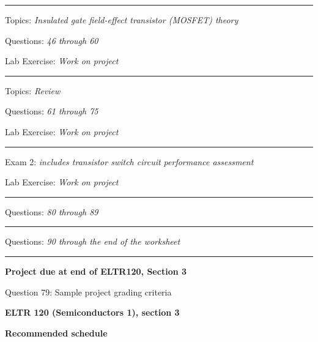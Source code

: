 \vskip 10pt
\hrule \vskip 5pt
\noindent
{}

\hskip 10pt Topics: {\it Insulated gate field-effect transistor (MOSFET) theory}
 
\hskip 10pt Questions: {\it 46 through 60}
 
\hskip 10pt Lab Exercise: {\it Work on project}
 

\vskip 10pt
\hrule \vskip 5pt
\noindent
{}

\hskip 10pt Topics: {\it Review}
 
\hskip 10pt Questions: {\it 61 through 75}
 
\hskip 10pt Lab Exercise: {\it Work on project}
 
\vskip 10pt
\hrule \vskip 5pt
\noindent
{}

\hskip 10pt Exam 2: {\it includes transistor switch circuit performance assessment}
 
\hskip 10pt Lab Exercise: {\it Work on project}

\vskip 10pt
\hrule \vskip 5pt
\noindent
{}

\hskip 10pt Questions: {\it 80 through 89}
 
\vskip 10pt
\hrule \vskip 5pt
\noindent
{}

\hskip 10pt Questions: {\it 90 through the end of the worksheet}
 
\vskip 10pt
\hrule \vskip 5pt
\noindent
{}

\hskip 10pt {\bf Project due at end of ELTR120, Section 3}
 
\hskip 10pt Question 79: Sample project grading criteria
 
\vskip 10pt












\vfil \eject

\centerline{\bf ELTR 120 (Semiconductors 1), section 3} \bigskip 
 
\vskip 10pt

\noindent
{\bf Recommended schedule}

